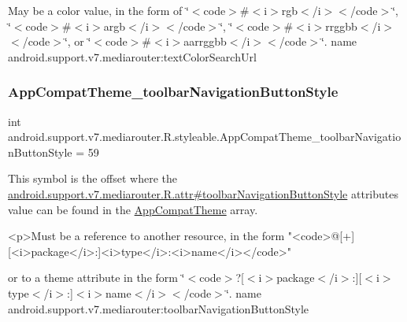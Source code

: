 May be a color value, in the form of \char`\"{}$<$code$>$\#$<$i$>$rgb$<$/i$>$$<$/code$>$\char`\"{}, \char`\"{}$<$code$>$\#$<$i$>$argb$<$/i$>$$<$/code$>$\char`\"{}, \char`\"{}$<$code$>$\#$<$i$>$rrggbb$<$/i$>$$<$/code$>$\char`\"{}, or \char`\"{}$<$code$>$\#$<$i$>$aarrggbb$<$/i$>$$<$/code$>$\char`\"{}.  name android.\+support.\+v7.\+mediarouter\+:text\+Color\+Search\+Url \mbox{\label{classandroid_1_1support_1_1v7_1_1mediarouter_1_1R_1_1styleable_a354b2153b08d409c7335a25b06bf98e2}} 
\subsubsection{\texorpdfstring{App\+Compat\+Theme\+\_\+toolbar\+Navigation\+Button\+Style}{AppCompatTheme\_toolbarNavigationButtonStyle}}
{\footnotesize\ttfamily int android.\+support.\+v7.\+mediarouter.\+R.\+styleable.\+App\+Compat\+Theme\+\_\+toolbar\+Navigation\+Button\+Style = 59\hspace{0.3cm}{\ttfamily [static]}}

This symbol is the offset where the \hyperlink{classandroid_1_1support_1_1v7_1_1mediarouter_1_1R_1_1attr_ad3987a159610886a0a354b684bfd9c76}{android.\+support.\+v7.\+mediarouter.\+R.\+attr\#toolbar\+Navigation\+Button\+Style} attribute\textquotesingle{}s value can be found in the \hyperlink{classandroid_1_1support_1_1v7_1_1mediarouter_1_1R_1_1styleable_a4e3d3900c75d49aeb2f283cac00214d6}{App\+Compat\+Theme} array.

\begin{DoxyVerb}      <p>Must be a reference to another resource, in the form "<code>@[+][<i>package</i>:]<i>type</i>:<i>name</i></code>"
\end{DoxyVerb}
 or to a theme attribute in the form \char`\"{}$<$code$>$?\mbox{[}$<$i$>$package$<$/i$>$\+:\mbox{]}\mbox{[}$<$i$>$type$<$/i$>$\+:\mbox{]}$<$i$>$name$<$/i$>$$<$/code$>$\char`\"{}.  name android.\+support.\+v7.\+mediarouter\+:toolbar\+Navigation\+Button\+Style \mbox{\label{classandroid_1_1support_1_1v7_1_1mediarouter_1_1R_1_1styleable_ad3fea9f4d259e9e79e8d8f944d3f692b}} 
